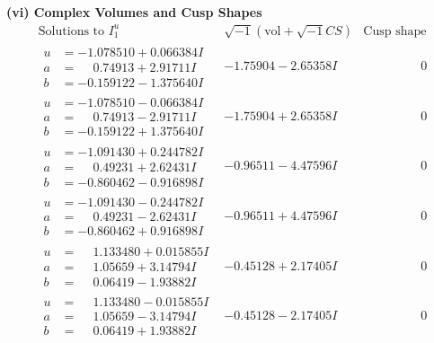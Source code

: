 \documentclass[1p]{elsarticle_modified}
\theoremstyle{definition}
\newcommand{\I}{\sqrt{-1}}
\begin{document}
\newpage\flushleft \textbf{(vi) Complex Volumes and Cusp Shapes}
$$\begin{array}{c|c|c}  
\text{Solutions to }I^u_{1}& \I (\text{vol} + \sqrt{-1}CS) & \text{Cusp shape}\\
 \hline 
\begin{aligned}
u &= -1.078510 + 0.066384 I \\
a &= \phantom{-}0.74913 + 2.91711 I \\
b &= -0.159122 - 1.375640 I\end{aligned}
 & -1.75904 - 2.65358 I & \phantom{-0.000000 } 0 \\ \hline\begin{aligned}
u &= -1.078510 - 0.066384 I \\
a &= \phantom{-}0.74913 - 2.91711 I \\
b &= -0.159122 + 1.375640 I\end{aligned}
 & -1.75904 + 2.65358 I & \phantom{-0.000000 } 0 \\ \hline\begin{aligned}
u &= -1.091430 + 0.244782 I \\
a &= \phantom{-}0.49231 + 2.62431 I \\
b &= -0.860462 - 0.916898 I\end{aligned}
 & -0.96511 - 4.47596 I & \phantom{-0.000000 } 0 \\ \hline\begin{aligned}
u &= -1.091430 - 0.244782 I \\
a &= \phantom{-}0.49231 - 2.62431 I \\
b &= -0.860462 + 0.916898 I\end{aligned}
 & -0.96511 + 4.47596 I & \phantom{-0.000000 } 0 \\ \hline\begin{aligned}
u &= \phantom{-}1.133480 + 0.015855 I \\
a &= \phantom{-}1.05659 + 3.14794 I \\
b &= \phantom{-}0.06419 - 1.93882 I\end{aligned}
 & -0.45128 + 2.17405 I & \phantom{-0.000000 } 0 \\ \hline\begin{aligned}
u &= \phantom{-}1.133480 - 0.015855 I \\
a &= \phantom{-}1.05659 - 3.14794 I \\
b &= \phantom{-}0.06419 + 1.93882 I\end{aligned}
 & -0.45128 - 2.17405 I & \phantom{-0.000000 } 0 \\ \hline\begin{aligned}

\end{aligned}
\end{array}$$
\end{document}
